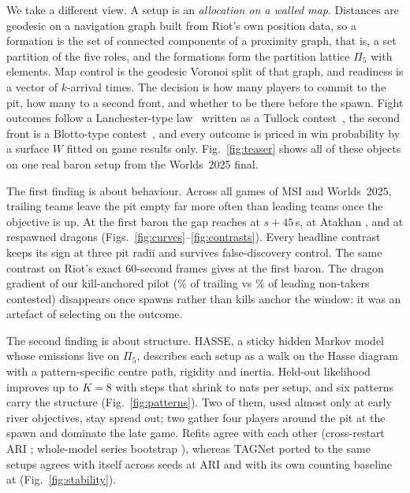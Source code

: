 We take a different view. A setup is an \emph{allocation on a walled map}.
Distances are geodesic on a navigation graph built from Riot's own position data, so a formation is the set of connected components of a proximity graph, that is, a set partition of the five roles, and the formations form the partition lattice $\Pi_5$ with  elements.
Map control is the geodesic Voronoi split of that graph, and readiness is a vector of $k$-arrival times.
The decision is how many players to commit to the pit, how many to a second front, and whether to be there before the spawn.
Fight outcomes follow a Lanchester-type law~\cite{lanchester1916aircraft} written as a Tullock contest~\cite{tullock1980efficient}, the second front is a Blotto-type contest~\cite{roberson2006colonel}, and every outcome is priced in win probability by a surface $W$ fitted on game results only.
Fig.~\ref{fig:teaser} shows all of these objects on one real baron setup from the Worlds~2025 final.

The first finding is about behaviour. Across all  games of MSI and Worlds~2025, trailing teams leave the pit empty far more often than leading teams once the objective is up.
At the first baron the gap reaches \pp{}  at $s{+}45$\,s, at Atakhan \pp{} , and at respawned dragons \pp{}  (Figs.~\ref{fig:curves}--\ref{fig:contrasts}).
Every headline contrast keeps its sign at three pit radii and survives false-discovery control.
The same contrast on Riot's exact 60-second frames gives \pp{}  at the first baron.
The dragon gradient of our kill-anchored pilot (\% of trailing vs \% of leading non-takers contested) disappears once spawns rather than kills anchor the window: it was an artefact of selecting on the outcome.

The second finding is about structure. HASSE, a sticky hidden Markov model whose emissions live on $\Pi_5$, describes each setup as a walk on the Hasse diagram with a pattern-specific centre path, rigidity and inertia.
Held-out likelihood improves up to $K=8$ with steps that shrink to  nats per setup, and six patterns carry the structure (Fig.~\ref{fig:patterns}).
Two of them, used almost only at early river objectives, stay spread out; two gather four players around the pit at the spawn and dominate the late game.
Refits agree with each other (cross-restart ARI ; whole-model series bootstrap ), whereas TAGNet ported to the same setups agrees with itself across seeds at ARI  and with its own counting baseline at  (Fig.~\ref{fig:stability}).

